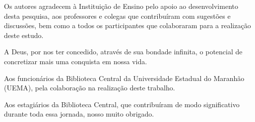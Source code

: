 \begin{agradecimentos}
Os autores agradecem à Instituição de Ensino pelo apoio ao desenvolvimento desta pesquisa, aos professores e colegas que contribuíram com sugestões e discussões, bem como a todos os participantes que colaboraram para a realização deste estudo.

A Deus, por nos ter concedido, através de sua bondade infinita, o potencial de concretizar mais uma conquista em nossa vida.

Aos funcionários da Biblioteca Central da Universidade Estadual do Maranhão (UEMA), pela colaboração na realização deste trabalho.

Aos estagiários da Biblioteca Central, que contribuíram de modo significativo durante toda essa jornada, nosso muito obrigado.
\end{agradecimentos}
